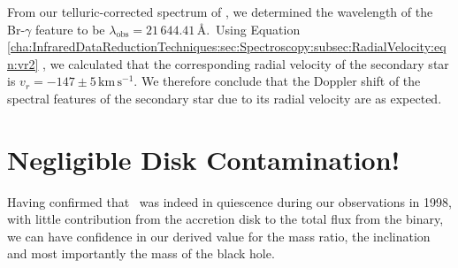\vspace{\myparskip}

From our telluric-corrected spectrum of \groj, we determined the
wavelength of the Br-$\gamma$ feature to be
$\lambda_{\mathrm{obs}}=21\,644.41$\,\AA.\@\ Using Equation~%
\vref{cha:InfraredDataReductionTechniques:sec:Spectroscopy:subsec:RadialVelocity:eqn:vr2}%
, we calculated that the corresponding radial velocity of the
secondary star is $v_r = -147\pm5\,\mathrm{km}\,\mathrm{s}^{-1}$. We
therefore conclude that the Doppler shift of the spectral features of
the secondary star due to its radial velocity are as expected. %


\section{Negligible Disk Contamination!}\label{cha:AccretionDiskContamination:sec:NegligibleDiskContamination}

Having confirmed that \groj\ was indeed in quiescence during our observations in 1998, with little contribution from the accretion disk to the total flux from the binary, we can have confidence in our derived value for the mass ratio, the inclination and most importantly the mass of the black hole. %

